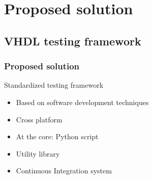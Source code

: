 \documentclass[british,10pt]{beamer}
\begin{document}
\section{Proposed solution}
\subsection{VHDL testing framework}

\begin{frame}\frametitle{Proposed solution}
Standardized testing framework
\begin{itemize}
\item Based on software development techniques
\item Cross platform
\item At the core: Python script
\item Utility library
\item Continuous Integration system
\end{itemize}
\end{frame}




\end{document}
